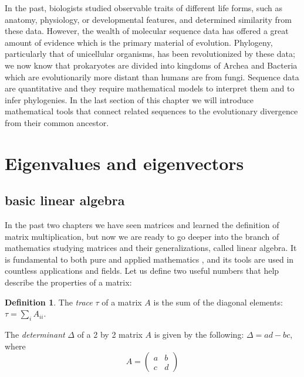 \documentclass[
]{book}
\theoremstyle{definition}
\newtheorem{definition}{Definition}[chapter]
\theoremstyle{definition}
\theoremstyle{definition}
\theoremstyle{remark}
\begin{document}
In the past, biologists studied observable traits of different life forms, such as anatomy, physiology, or developmental features, and determined similarity from these data. However, the wealth of molecular sequence data has offered a great amount of evidence which is the primary material of evolution. Phylogeny, particularly that of unicellular organisms, has been revolutionized by these data; we now know that prokaryotes are divided into kingdoms of Archea and Bacteria which are evolutionarily more distant than humans are from fungi. Sequence data are quantitative and they require mathematical models to interpret them and to infer phylogenies. In the last section of this chapter we will introduce mathematical tools that connect related sequences to the evolutionary divergence from their common ancestor.

\hypertarget{eigenvalues-and-eigenvectors}{%
\section{Eigenvalues and eigenvectors}\label{eigenvalues-and-eigenvectors}}

\hypertarget{basic-linear-algebra}{%
\subsection{basic linear algebra}\label{basic-linear-algebra}}

In the past two chapters we have seen matrices and learned the definition of matrix multiplication, but now we are ready to go deeper into the branch of mathematics studying matrices and their generalizations, called linear algebra. It is fundamental to both pure and applied mathematics \citep{strang_linear_2005}, and its tools are used in countless applications and fields. Let us define two useful numbers that help describe the properties of a matrix:

\begin{definition}
\protect\hypertarget{def:def-matrix-tr}{}{\label{def:def-matrix-tr} }The \emph{trace} \(\tau\) of a matrix \(A\) is the sum of the diagonal elements: \(\tau = \sum_i A_{ii}\).

The \emph{determinant} \(\Delta\) of a 2 by 2 matrix \(A\) is given by the following: \(\Delta = ad - bc\), where
\[ A = \left(\begin{array}{cc}a & b \\c & d\end{array}\right) \]
\end{definition}
\end{document}
